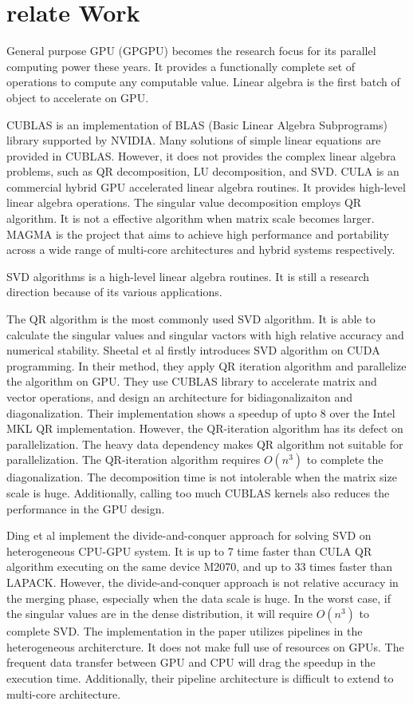 \section{relate Work}
General purpose GPU (GPGPU) becomes the research focus for its parallel computing power these years.
It provides a functionally complete set of operations to compute any computable value.
Linear algebra is the first batch of object to accelerate on GPU.

CUBLAS is an implementation of BLAS (Basic Linear Algebra Subprograms) library supported by NVIDIA\cite{cublas}.
Many solutions of simple linear equations are provided in CUBLAS.
However, it does not provides the complex linear algebra problems, such as QR decomposition, LU decomposition, and SVD.
CULA is an commercial hybrid GPU accelerated linear algebra routines\cite{cula}.
It provides high-level linear algebra operations. The singular value decomposition employs QR algorithm. It is not a effective algorithm when matrix scale becomes larger.
MAGMA is the project that aims to achieve high performance and portability across a wide range of multi-core architectures and hybrid systems respectively\cite{magma}.

SVD algorithms is a high-level linear algebra routines.
It is still a research direction because of its various applications.

The QR algorithm is the most commonly used SVD algorithm.
It is able to calculate the singular values and singular vactors with high relative accuracy and numerical stability\cite{97bookalgebra}. 
Sheetal et al\cite{09IPDPSQR} firstly introduces SVD algorithm on CUDA programming.
In their method, they apply QR iteration algorithm and parallelize the algorithm on GPU.
They use CUBLAS library to accelerate matrix and vector operations, and design an architecture for bidiagonalizaiton and diagonalization. 
Their implementation shows a speedup of upto 8 over the Intel MKL QR implementation.
However, the QR-iteration algorithm has its defect on parallelization.
The heavy data dependency makes QR algorithm not suitable for parallelization.
The QR-iteration algorithm requires $O(n^3)$ to complete the diagonalization. The decomposition time is not intolerable when the matrix size scale is huge.
Additionally, calling too much CUBLAS kernels also reduces the performance in the GPU design.

Ding et al\cite{13CFDC} implement the divide-and-conquer approach for solving SVD on heterogeneous CPU-GPU system.
It is up to 7 time faster than CULA QR algorithm executing on the same device M2070, and up to 33 times faster than LAPACK.
However, the divide-and-conquer approach is not relative accuracy in the merging phase, especially when the data scale is huge.
In the worst case, if the singular values are in the dense distribution, it will require $O(n^3)$ to complete SVD\cite{97bookalgebra}.
The implementation in the paper utilizes pipelines in the heterogeneous architercture.
It does not make full use of resources on GPUs.
The frequent data transfer between GPU and CPU will drag the speedup in the execution time.
Additionally, their pipeline architecture is difficult to extend to multi-core architecture.

